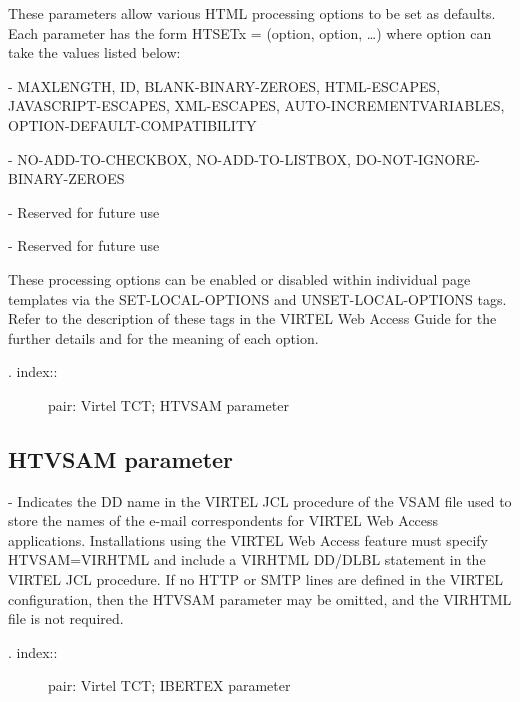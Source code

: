 \documentclass[letterpaper,10pt,english]{sphinxmanual}
\begin{document}
These parameters allow various HTML processing options to be set as defaults. Each parameter has the form HTSETx = (option, option, …) where option can take the values listed below:

 - MAXLENGTH, ID, BLANK-BINARY-ZEROES, HTML-ESCAPES, JAVASCRIPT-ESCAPES, XML-ESCAPES, AUTO-INCREMENTVARIABLES, OPTION-DEFAULT-COMPATIBILITY

 - NO-ADD-TO-CHECKBOX, NO-ADD-TO-LISTBOX, DO-NOT-IGNORE-BINARY-ZEROES

 - Reserved for future use

 - Reserved for future use

These processing options can be enabled or disabled within individual page templates via the SET-LOCAL-OPTIONS and UNSET-LOCAL-OPTIONS tags. Refer to the description of these tags in the VIRTEL Web Access Guide for the further details and for the meaning of each option.
\begin{description}
\item[{. index::}] \leavevmode
pair: Virtel TCT; HTVSAM parameter

\end{description}


\subsection{HTVSAM parameter}
\label{\detokenize{Installation_Guide:htvsam-parameter}}
\begin{sphinxVerbatim}[commandchars=\\\{\}]
                      
\end{sphinxVerbatim}

 - Indicates the DD name in the VIRTEL JCL procedure of the VSAM file used to store the names of the e-mail correspondents for VIRTEL Web Access applications. Installations using the VIRTEL Web Access feature must specify HTVSAM=VIRHTML and include a VIRHTML DD/DLBL statement in the VIRTEL JCL procedure. If no HTTP or SMTP lines are defined in the VIRTEL configuration, then the HTVSAM parameter may be omitted, and the VIRHTML file is not required.
\begin{description}
\item[{. index::}] \leavevmode
pair: Virtel TCT; IBERTEX parameter

\end{description}
\end{document}
